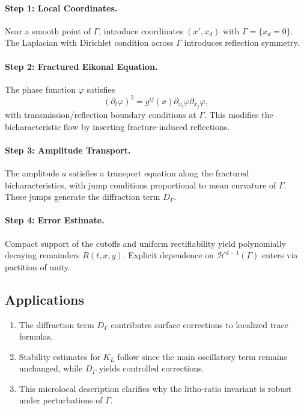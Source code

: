 \paragraph{Step 1: Local Coordinates.}
Near a smooth point of $\Gamma$, introduce coordinates $(x',x_d)$ with 
$\Gamma = \{ x_d = 0\}$. The Laplacian with Dirichlet condition across 
$\Gamma$ introduces reflection symmetry.

\paragraph{Step 2: Fractured Eikonal Equation.}
The phase function $\varphi$ satisfies
\[
(\partial_t \varphi)^2 = g^{ij}(x) \partial_{x_i}\varphi \partial_{x_j}\varphi,
\]
with transmission/reflection boundary conditions at $\Gamma$. This modifies 
the bicharacteristic flow by inserting fracture-induced reflections.

\paragraph{Step 3: Amplitude Transport.}
The amplitude $a$ satisfies a transport equation along the fractured 
bicharacteristics, with jump conditions proportional to mean curvature of 
$\Gamma$. These jumps generate the diffraction term $D_\Gamma$.

\paragraph{Step 4: Error Estimate.}
Compact support of the cutoffs and uniform rectifiability yield polynomially 
decaying remainders $R(t,x,y)$. Explicit dependence on 
$\mathcal{H}^{d-1}(\Gamma)$ enters via partition of unity.

\subsection*{Applications}
\begin{enumerate}
  \item The diffraction term $D_\Gamma$ contributes surface corrections to 
  localized trace formulas.
  \item Stability estimates for $K_L$ follow since the main oscillatory term 
  remains unchanged, while $D_\Gamma$ yields controlled corrections.
  \item This microlocal description clarifies why the litho-ratio invariant 
  is robust under perturbations of $\Gamma$.
\end{enumerate}


